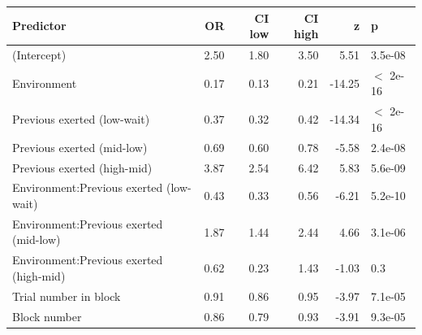 \begin{table}[ht]
\centering
\begin{tabular}{lrrrrl}
  \hline
Predictor & OR & CI low & CI high & z & p \\ 
  \hline
(Intercept) & 2.50 & 1.80 & 3.50 & 5.51 & 3.5e-08 \\ 
  Environment & 0.17 & 0.13 & 0.21 & -14.25 & $<$ 2e-16 \\ 
  Previous exerted (low-wait) & 0.37 & 0.32 & 0.42 & -14.34 & $<$ 2e-16 \\ 
  Previous exerted (mid-low) & 0.69 & 0.60 & 0.78 & -5.58 & 2.4e-08 \\ 
  Previous exerted (high-mid) & 3.87 & 2.54 & 6.42 & 5.83 & 5.6e-09 \\ 
  Environment:Previous exerted (low-wait) & 0.43 & 0.33 & 0.56 & -6.21 & 5.2e-10 \\ 
  Environment:Previous exerted (mid-low) & 1.87 & 1.44 & 2.44 & 4.66 & 3.1e-06 \\ 
  Environment:Previous exerted (high-mid) & 0.62 & 0.23 & 1.43 & -1.03 & 0.3 \\ 
  Trial number in block & 0.91 & 0.86 & 0.95 & -3.97 & 7.1e-05 \\ 
  Block number & 0.86 & 0.79 & 0.93 & -3.91 & 9.3e-05 \\ 
   \hline
\end{tabular}
\end{table}
